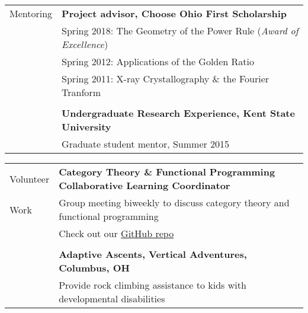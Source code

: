 \documentclass[letterpaper,10pt,oneside]{article}
\begin{document}
\noindent \begin{tabular}{@{} l l}
 \Large{Mentoring} & \textbf{Project advisor, Choose Ohio First Scholarship} \\
 \hspace{1.1in} & Spring 2018: The Geometry of the Power Rule (\emph{Award of Excellence}) \\
 & Spring 2012: Applications of the Golden Ratio \\
 & Spring 2011: X-ray Crystallography \& the Fourier Tranform \\
 \hspace{1.1in} & \\
 & \textbf{Undergraduate Research Experience, Kent State University} \\
 & Graduate student mentor, Summer 2015 \\
\end{tabular}

\vfill

\noindent \begin{tabular}{@{} l l}
 \Large{Volunteer} & \textbf{Category Theory \& Functional Programming Collaborative Learning Coordinator} \\
 \Large{Work} & Group meeting biweekly to discuss category theory and functional programming \\
 \hspace{1.1in} & Check out our \href{https://github.com/Isaac-DeFrain/Cats-FunProg}{GitHub repo} \\
 & \\
 & \textbf{Adaptive Ascents, Vertical Adventures, Columbus, OH} \\
 & Provide rock climbing assistance to kids with developmental disabilities \\
\end{tabular}
\end{document}

